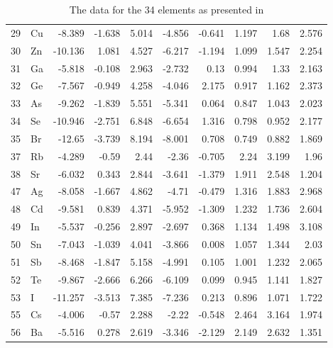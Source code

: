 \documentclass[11pt,oneside,czech,american]{book} %
\theoremstyle{plain}
\theoremstyle{definition}
\begin{document}
\begin{table}[H]
\begin{tabular}{rlrrrrrrrr}
		29 & Cu     &  -8.389 & -1.638 &  5.014 &  -4.856 & -0.641 & 1.197 & 1.68  & 2.576 \\
		30 & Zn     & -10.136 &  1.081 &  4.527 &  -6.217 & -1.194 & 1.099 & 1.547 & 2.254 \\
		31 & Ga     &  -5.818 & -0.108 &  2.963 &  -2.732 &  0.13  & 0.994 & 1.33  & 2.163 \\
		32 & Ge     &  -7.567 & -0.949 &  4.258 &  -4.046 &  2.175 & 0.917 & 1.162 & 2.373 \\
		33 & As     &  -9.262 & -1.839 &  5.551 &  -5.341 &  0.064 & 0.847 & 1.043 & 2.023 \\
		34 & Se     & -10.946 & -2.751 &  6.848 &  -6.654 &  1.316 & 0.798 & 0.952 & 2.177 \\
		35 & Br     & -12.65  & -3.739 &  8.194 &  -8.001 &  0.708 & 0.749 & 0.882 & 1.869 \\
		37 & Rb     &  -4.289 & -0.59  &  2.44  &  -2.36  & -0.705 & 2.24  & 3.199 & 1.96  \\
		38 & Sr     &  -6.032 &  0.343 &  2.844 &  -3.641 & -1.379 & 1.911 & 2.548 & 1.204 \\
		47 & Ag     &  -8.058 & -1.667 &  4.862 &  -4.71  & -0.479 & 1.316 & 1.883 & 2.968 \\
		48 & Cd     &  -9.581 &  0.839 &  4.371 &  -5.952 & -1.309 & 1.232 & 1.736 & 2.604 \\
		49 & In     &  -5.537 & -0.256 &  2.897 &  -2.697 &  0.368 & 1.134 & 1.498 & 3.108 \\
		50 & Sn     &  -7.043 & -1.039 &  4.041 &  -3.866 &  0.008 & 1.057 & 1.344 & 2.03  \\
		51 & Sb     &  -8.468 & -1.847 &  5.158 &  -4.991 &  0.105 & 1.001 & 1.232 & 2.065 \\
		52 & Te     &  -9.867 & -2.666 &  6.266 &  -6.109 &  0.099 & 0.945 & 1.141 & 1.827 \\
		53 & I      & -11.257 & -3.513 &  7.385 &  -7.236 &  0.213 & 0.896 & 1.071 & 1.722 \\
		55 & Cs     &  -4.006 & -0.57  &  2.288 &  -2.22  & -0.548 & 2.464 & 3.164 & 1.974 \\
		56 & Ba     &  -5.516 &  0.278 &  2.619 &  -3.346 & -2.129 & 2.149 & 2.632 & 1.351 \\
		\hline
	\end{tabular}
\caption{The data for the 34 elements as presented in \parencite{ghiringhelli15_supplementary}}
\end{table}
\end{document}
